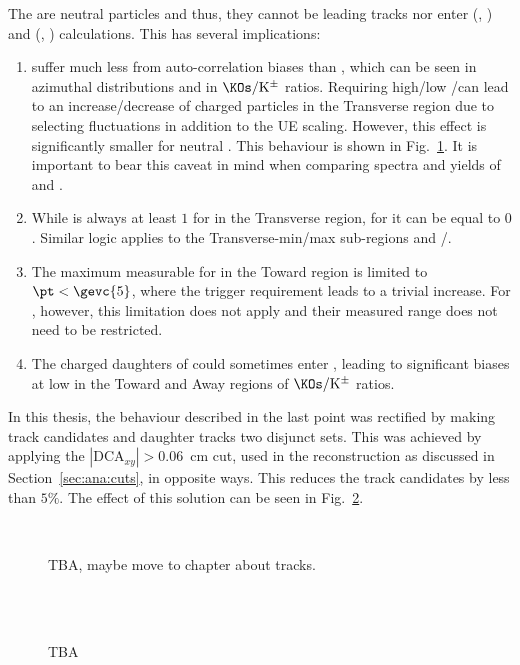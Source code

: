 The \VOs are neutral particles and thus, they cannot be leading tracks nor enter \NT (\NTmin, \NTmax) and \RT (\RTmin, \RTmax) calculations. This has several implications:
\begin{enumerate}
\item \VOs suffer much less from auto-correlation biases than \pikp, which can be seen in azimuthal distributions and in $\KOs / \mathrm{K}^\pm$ ratios. Requiring high/low \NT/\RT can lead to an increase/decrease of charged particles in the Transverse region due to selecting fluctuations in addition to the UE scaling. However, this effect is significantly smaller for neutral \VOs. This behaviour is shown in Fig.~\ref{fig:rt:autocorr}. It is important to bear this caveat in mind when comparing \pt spectra and yields of \pikp and \VOs.
\item While \NT is always at least $1$ for \pikp in the Transverse region, for \VOs it can be equal to $0$. Similar logic applies to the Transverse-min/max sub-regions and \NTmin/\NTmax .
\item The maximum \pt measurable for \pikp in the Toward region is limited to $\pt < \gevc{5}$, where the trigger requirement leads to a trivial increase. For \VOs, however, this limitation does not apply and their measured \pt range does not need to be restricted.
\item The charged daughters of \VOs could sometimes enter \NT, leading to significant biases at low \pt in the Toward and Away regions of $\KOs/\mathrm{K}^\pm$ ratios. 
\end{enumerate} 

In this thesis, the behaviour described in the last point was rectified by making \NT track candidates and \VO daughter tracks two disjunct sets. This was achieved by applying the $|\mathrm{DCA}_{xy}|>0.06$~cm cut, used in the \VO reconstruction as discussed in Section~\ref{sec:ana:cuts}, in opposite ways. This reduces the \NT track candidates by less than $5\%$. The effect of this solution can be seen in Fig.~\ref{fig:rt:KtoK}.

\begin{figure}%
\\
\caption{TBA, maybe move to chapter about tracks.}
\label{fig:rt:autocorr}
\end{figure}


\begin{figure}%
\\
\\
\caption{TBA}
\label{fig:rt:KtoK}
\end{figure}

